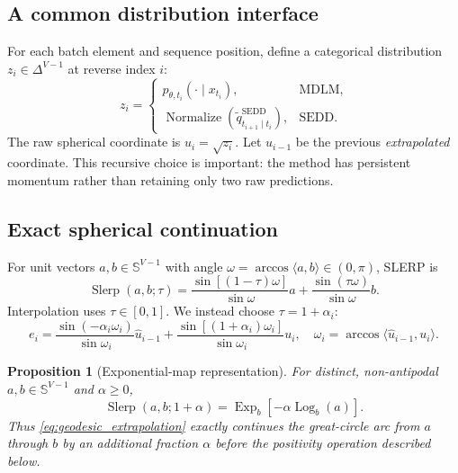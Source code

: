 \documentclass[10pt]{article}
\newtheorem{proposition}{Proposition}
\newcommand{\simplex}{\Delta^{V-1}}
\newcommand{\sphere}{\mathbb{S}^{V-1}}
\newcommand{\Exp}{\operatorname{Exp}}
\newcommand{\Log}{\operatorname{Log}}
\newcommand{\Slerp}{\operatorname{Slerp}}
\begin{document}
\subsection{A common distribution interface}

For each batch element and sequence position, define a categorical distribution $z_i\in\simplex$ at
reverse index $i$:
\begin{equation}
  z_i =
  \begin{cases}
    p_{\theta,t_i}(\cdot\mid x_{t_i}), & \text{MDLM},\\
    \operatorname{Normalize}(\widetilde q^{\mathrm{SEDD}}_{t_{i+1}\mid t_i}), & \text{SEDD}.
  \end{cases}
  \label{eq:common_distribution}
\end{equation}
The raw spherical coordinate is $u_i=\sqrt{z_i}$.  Let $\widehat u_{i-1}$ be the previous
\emph{extrapolated} coordinate.  This recursive choice is important: the method has persistent momentum
rather than retaining only two raw predictions.

\subsection{Exact spherical continuation}

For unit vectors $a,b\in\sphere$ with angle $\omega=\arccos\langle a,b\rangle\in(0,\pi)$,
SLERP is \citep{shoemake1985slerp}
\begin{equation}
  \Slerp(a,b;\tau)
  =\frac{\sin[(1-\tau)\omega]}{\sin\omega}a
   +\frac{\sin(\tau\omega)}{\sin\omega}b.
  \label{eq:slerp}
\end{equation}
Interpolation uses $\tau\in[0,1]$.  We instead choose $\tau=1+\alpha_i$:
\begin{equation}
  e_i
  =\frac{\sin(-\alpha_i\omega_i)}{\sin\omega_i}\widehat u_{i-1}
   +\frac{\sin[(1+\alpha_i)\omega_i]}{\sin\omega_i}u_i,
  \quad
  \omega_i=\arccos\langle\widehat u_{i-1},u_i\rangle.
  \label{eq:geodesic_extrapolation}
\end{equation}

\begin{proposition}[Exponential-map representation]
For distinct, non-antipodal $a,b\in\sphere$ and $\alpha\ge 0$,
\begin{equation}
  \Slerp(a,b;1+\alpha)
  =\Exp_b\!\left[-\alpha\Log_b(a)\right].
  \label{eq:exp_equivalence}
\end{equation}
Thus \cref{eq:geodesic_extrapolation} exactly continues the great-circle arc from $a$ through $b$ by
an additional fraction $\alpha$ before the positivity operation described below.
\end{proposition}
\end{document}

